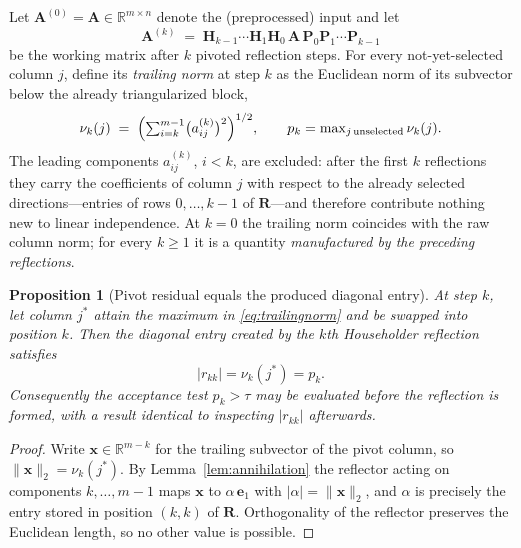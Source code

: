\documentclass[11pt,a4paper]{article}
\newtheorem{proposition}[theorem]{Proposition}
\theoremstyle{definition}
\newcommand{\R}{\mathbb{R}}
\begin{document}
Let $\bm A^{(0)}=\bm A\in\R^{m\times n}$ denote the (preprocessed)
input and let
\begin{equation}
  \bm A^{(k)}
  \;=\;
  \bm H_{k-1}\cdots\bm H_{1}\bm H_{0}\,\bm A\,\bm P_{0}\bm P_{1}\cdots
  \bm P_{k-1}
  \label{eq:workingmatrix}
\end{equation}
be the working matrix after $k$ pivoted reflection steps. For every
not-yet-selected column $j$, define its \emph{trailing norm} at step
$k$ as the Euclidean norm of its subvector below the already
triangularized block,
\begin{equation}
  \nu_k(j)
  \;=\;
  \Bigl(\textstyle\sum_{i=k}^{m-1}
        \bigl(a^{(k)}_{ij}\bigr)^{2}\Bigr)^{1/2},
  \qquad
  p_k=\max_{j\,\text{unselected}}\nu_k(j).
  \label{eq:trailingnorm}
\end{equation}
The leading components $a^{(k)}_{ij}$, $i<k$, are excluded: after the
first $k$ reflections they carry the coefficients of column $j$ with
respect to the already selected directions---entries of rows
$0,\dots,k-1$ of $\bm R$---and therefore contribute nothing new to
linear independence. At $k=0$ the trailing norm coincides with the raw
column norm; for every $k\ge1$ it is a quantity \emph{manufactured by
the preceding reflections}.

\begin{proposition}[Pivot residual equals the produced diagonal entry]
\label{prop:trailing}
At step $k$, let column $j^{\ast}$ attain the maximum in
\eqref{eq:trailingnorm} and be swapped into position $k$. Then the
diagonal entry created by the $k$th Householder reflection satisfies
\begin{equation}
  |r_{kk}|=\nu_k(j^{\ast})=p_k .
\end{equation}
Consequently the acceptance test $p_k>\tau$ may be evaluated
\emph{before} the reflection is formed, with a result identical to
inspecting $|r_{kk}|$ afterwards.
\end{proposition}

\begin{proof}
Write $\bm x\in\R^{m-k}$ for the trailing subvector of the pivot
column, so $\|\bm x\|_{2}=\nu_k(j^{\ast})$. By
Lemma~\ref{lem:annihilation} the reflector acting on components
$k,\dots,m-1$ maps $\bm x$ to $\alpha\,\bm e_{1}$ with
$|\alpha|=\|\bm x\|_{2}$, and $\alpha$ is precisely the entry stored
in position $(k,k)$ of $\bm R$. Orthogonality of the reflector
preserves the Euclidean length, so no other value is possible.
\end{proof}
\end{document}
